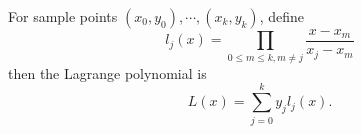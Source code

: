 For sample points $(x_0, y_0), \cdots, (x_k, y_k)$, define 
$$l_j(x) = \prod_{0 \leq m \leq k, m \neq j} \frac{x - x_m}{x_j - x_m}$$
then the Lagrange polynomial is
$$L(x) = \sum_{j=0}^k y_j l_j(x). $$
